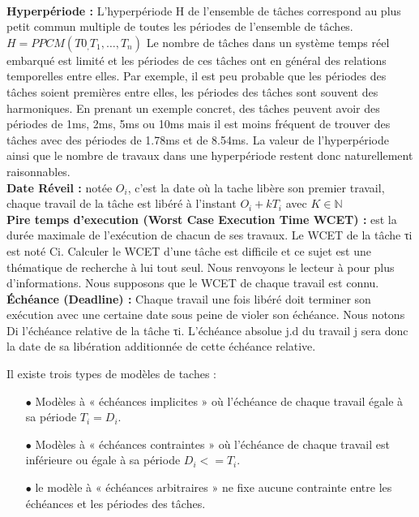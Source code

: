 \\ \indent \textbf{Hyperpériode :} L’hyperpériode H de l’ensemble de tâches correspond au plus petit commun multiple de toutes les périodes de l’ensemble de tâches.
$H = PPCM({T0_,T_1,…,T_n})$
Le nombre de tâches dans un système temps réel embarqué est limité et les périodes de ces tâches ont en général des relations temporelles entre elles. Par exemple, il est peu probable que les périodes des tâches soient premières entre elles, les périodes des tâches sont souvent des harmoniques. En prenant un exemple concret, des tâches peuvent avoir des périodes de 1ms, 2ms, 5ms ou 10ms mais il est moins fréquent de trouver des tâches avec des périodes de 1.78ms et de 8.54ms. La valeur de l’hyperpériode ainsi que le nombre de travaux dans une hyperpériode restent donc naturellement raisonnables.
\\ \indent \textbf{Date Réveil :} notée $O_i$, c’est la date où la tache libère son premier travail, chaque travail de la tâche est libéré à l’instant $O_i + kT_i$ avec $K \in \mathbb{N}$
\\ \indent \textbf{Pire temps d’execution (Worst Case Execution Time WCET) :} est la durée maximale de l’exécution de chacun de ses travaux. Le WCET de la tâche τi est noté Ci. Calculer le WCET d’une tâche est difficile et ce sujet est une thématique de recherche à lui tout seul. Nous renvoyons le lecteur à \cite{WEE+08} pour plus d’informations. Nous supposons que le WCET de chaque travail est connu.
\\ \indent \textbf{Échéance (Deadline) :} Chaque travail une fois libéré doit terminer son exécution avec une certaine date sous peine de violer son échéance. Nous notons Di l’échéance relative de la tâche τi. L’échéance absolue j.d du travail j sera donc la date de sa libération additionnée de cette échéance relative.

Il existe trois types de modèles  de taches : \\

\begin{itemize}
\item[$\bullet$] Modèles à « échéances implicites » où l’échéance de chaque travail égale à sa période $T_i = D_i$.
\item[$\bullet$] Modèles à « échéances contraintes » où l’échéance de chaque travail est inférieure ou égale à sa période $D_i <= T_i$.
\item[$\bullet$] le modèle à « échéances arbitraires » ne fixe aucune contrainte entre les échéances et les périodes des tâches.
\end{itemize}

